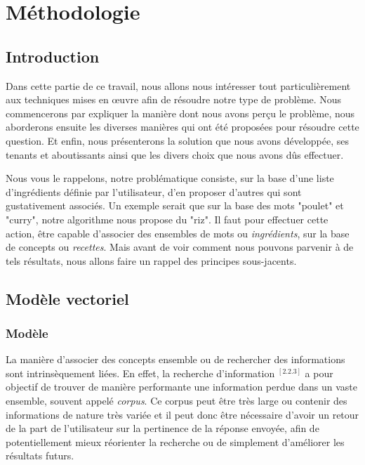 \chapter{Méthodologie}

\section{Introduction}

Dans cette partie de ce travail, nous allons nous intéresser tout particulièrement aux techniques mises en œuvre afin de résoudre notre type de problème. Nous commencerons par expliquer la manière dont nous avons perçu le problème, nous aborderons ensuite les diverses manières qui ont été proposées pour résoudre cette question. Et enfin, nous présenterons la solution que nous avons développée, ses tenants et aboutissants ainsi que les divers choix que nous avons dûs effectuer.

Nous vous le rappelons, notre problématique consiste, sur la base d'une liste d'ingrédients définie par l'utilisateur, d'en proposer d'autres qui sont gustativement associés. Un exemple serait que sur la base des mots "poulet" et "curry", notre algorithme nous propose du "riz". Il faut pour effectuer cette action, être capable d'associer des ensembles de mots ou \textit{ingrédients}, sur la base de concepts ou \textit{recettes}. Mais avant de voir comment nous pouvons parvenir à de tels résultats, nous allons faire un rappel des principes sous-jacents.

\section{Modèle vectoriel}

\subsection{Modèle}

La manière d'associer des concepts ensemble ou de rechercher des informations sont intrinsèquement liées. En effet, la recherche d'information $^{[2.2.3]}$ a pour objectif de trouver de manière performante une information perdue dans un vaste ensemble, souvent appelé \textit{corpus}. Ce corpus peut être très large ou contenir des informations de nature très variée et il peut donc être nécessaire d'avoir un retour de la part de l'utilisateur sur la pertinence de la réponse envoyée, afin de potentiellement mieux réorienter la recherche ou de simplement d'améliorer les résultats futurs.

